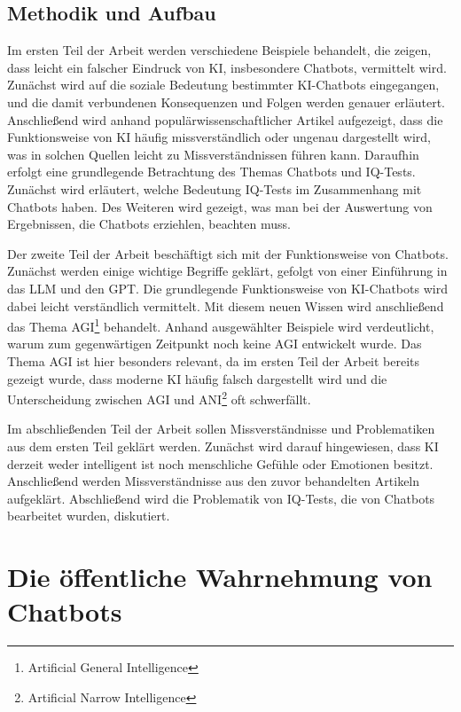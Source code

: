 	\subsection{Methodik und Aufbau} 
	Im ersten Teil der Arbeit werden verschiedene Beispiele behandelt, die zeigen, dass leicht ein falscher 
	Eindruck von KI, insbesondere Chatbots, vermittelt wird. Zunächst wird auf die soziale Bedeutung bestimmter
	KI-Chatbots eingegangen, und die damit verbundenen Konsequenzen und Folgen werden genauer erläutert. Anschließend
	wird anhand populärwissenschaftlicher Artikel aufgezeigt, dass die Funktionsweise von KI häufig missverständlich 
	oder ungenau dargestellt wird, was in solchen Quellen leicht zu Missverständnissen führen kann.
	Daraufhin erfolgt eine grundlegende Betrachtung des Themas Chatbots und IQ-Tests. Zunächst wird erläutert, welche
	Bedeutung IQ-Tests im Zusammenhang mit Chatbots haben. Des Weiteren wird gezeigt, was man bei der Auswertung von 
	Ergebnissen, die Chatbots erziehlen, beachten muss.

	Der zweite Teil der Arbeit beschäftigt sich mit der Funktionsweise von Chatbots. Zunächst werden einige wichtige Begriffe
	geklärt, gefolgt von einer Einführung in das LLM und den GPT. Die grundlegende Funktionsweise von KI-Chatbots wird dabei 
	leicht verständlich vermittelt. Mit diesem neuen Wissen wird anschließend das Thema AGI\footnote{Artificial General Intelligence} behandelt. 
	Anhand ausgewählter Beispiele wird verdeutlicht, warum zum gegenwärtigen Zeitpunkt noch keine AGI entwickelt wurde. Das Thema AGI ist hier 
	besonders relevant, da im ersten Teil der Arbeit bereits gezeigt wurde, dass moderne KI häufig falsch dargestellt wird und die Unterscheidung 
	zwischen AGI und ANI\footnote{Artificial Narrow Intelligence} oft schwerfällt.

	Im abschließenden Teil der Arbeit sollen Missverständnisse und Problematiken aus dem ersten Teil geklärt werden. Zunächst wird 
	darauf hingewiesen, dass KI derzeit weder intelligent ist noch menschliche Gefühle oder Emotionen besitzt. Anschließend werden 
	Missverständnisse aus den zuvor behandelten Artikeln aufgeklärt. Abschließend wird die Problematik von IQ-Tests, die von Chatbots 
	bearbeitet wurden, diskutiert. 	
	
	
\clearpage
\section{Die öffentliche Wahrnehmung von Chatbots}\label{s1}

